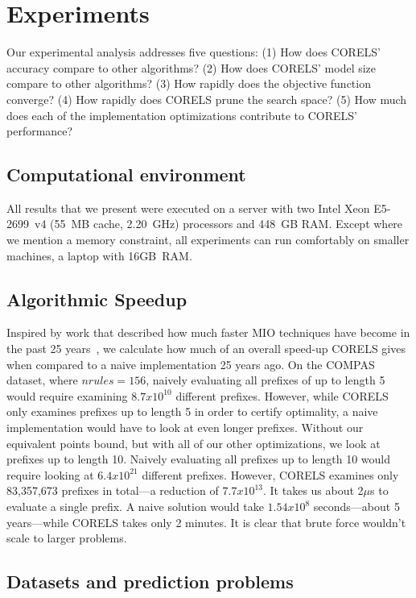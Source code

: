\section{Experiments}
\label{sec:experiments}

Our experimental analysis addresses five questions:
(1) How does CORELS' accuracy compare to other algorithms?
(2) How does CORELS' model size compare to other algorithms?
(3) How rapidly does the objective function converge?
(4) How rapidly does CORELS prune the search space?
(5) How much does each of the implementation optimizations contribute to CORELS' performance?

\subsection{Computational environment}

All results that we present were executed on a server with two Intel Xeon E5-2699~v4
(55~MB cache, 2.20~GHz) processors and 448~GB RAM.
%
Except where we mention a memory constraint, all experiments
can run comfortably on smaller machines, \eg a laptop with 16GB~RAM.

\subsection{Algorithmic Speedup}
Inspired by work that described how much faster MIO techniques have become in the past 25 years~\citep{Bertsimas16}, 
we calculate how much of an overall speed-up CORELS gives when compared to a naive implementation 25 years ago.
%
On the COMPAS dataset, where $nrules = 156$, naively evaluating all prefixes of up to length 5 would
require examining $8.7 x 10^{10}$ different prefixes.
%
However, while CORELS only examines prefixes up to length 5 in order to certify optimality, a naive implementation 
would have to look at even longer prefixes. 
%
Without our equivalent points bound, but with all of our other optimizations, we look at prefixes up to length 10.
%
Naively evaluating all prefixes up to length 10 would require looking at $6.4 x 10^{21}$ different prefixes.
%
However, CORELS examines only 83,357,673 prefixes in total---a reduction of $7.7 x 10^{13}$.
%
It takes us about 2$\mu$s to evaluate a single prefix.
%
A naive solution would take $1.54 x 10^8$ seconds---about 5 years---while CORELS takes only 2 minutes.
%
It is clear that brute force wouldn't scale to larger problems.
%

\subsection{Datasets and prediction problems}

